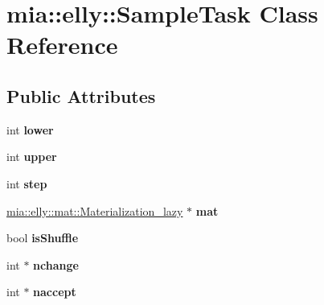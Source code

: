\hypertarget{classmia_1_1elly_1_1_sample_task}{\section{mia\-:\-:elly\-:\-:Sample\-Task Class Reference}
\label{classmia_1_1elly_1_1_sample_task}
}
\subsection*{Public Attributes}
\begin{DoxyCompactItemize}
\item 
\hypertarget{classmia_1_1elly_1_1_sample_task_a670314f827295577a67d96fbde05cc98}{int {\bfseries lower}}\label{classmia_1_1elly_1_1_sample_task_a670314f827295577a67d96fbde05cc98}

\item 
\hypertarget{classmia_1_1elly_1_1_sample_task_a2c68193169212401fd9dfc53669ac615}{int {\bfseries upper}}\label{classmia_1_1elly_1_1_sample_task_a2c68193169212401fd9dfc53669ac615}

\item 
\hypertarget{classmia_1_1elly_1_1_sample_task_aac20c514247f8c744d7875f75285e620}{int {\bfseries step}}\label{classmia_1_1elly_1_1_sample_task_aac20c514247f8c744d7875f75285e620}

\item 
\hypertarget{classmia_1_1elly_1_1_sample_task_ad3f4357179b2e6be1edada71febed8de}{\hyperlink{classmia_1_1elly_1_1mat_1_1_materialization__lazy}{mia\-::elly\-::mat\-::\-Materialization\-\_\-lazy} $\ast$ {\bfseries mat}}\label{classmia_1_1elly_1_1_sample_task_ad3f4357179b2e6be1edada71febed8de}

\item 
\hypertarget{classmia_1_1elly_1_1_sample_task_a6d722099cbec603924b6b70b5d68360e}{bool {\bfseries is\-Shuffle}}\label{classmia_1_1elly_1_1_sample_task_a6d722099cbec603924b6b70b5d68360e}

\item 
\hypertarget{classmia_1_1elly_1_1_sample_task_a5991780307c024d2f458bf264db39e4a}{int $\ast$ {\bfseries nchange}}\label{classmia_1_1elly_1_1_sample_task_a5991780307c024d2f458bf264db39e4a}

\item 
\hypertarget{classmia_1_1elly_1_1_sample_task_af640fef9f121e0d175ea710260b78746}{int $\ast$ {\bfseries naccept}}\label{classmia_1_1elly_1_1_sample_task_af640fef9f121e0d175ea710260b78746}


\end{DoxyCompactItemize}
